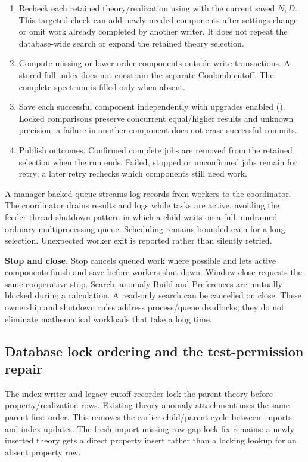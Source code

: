\begin{enumerate}
\item Recheck each retained theory/realization using
 with the current saved $N,D$.
This targeted check can add newly needed components after settings change
or omit work already completed by another writer. It does not repeat the
database-wide search or expand the retained theory selection.
\item Compute missing or lower-order components outside write transactions.
A stored full index does not constrain the separate Coulomb cutoff.
The complete spectrum is filled only when absent.
\item Save each successful component independently with upgrades enabled
(). Locked comparisons preserve concurrent
equal/higher results and unknown precision; a failure in another component
does not erase successful commits.
\item Publish outcomes. Confirmed complete jobs are removed from the retained
selection when the run ends. Failed, stopped or unconfirmed jobs remain for
retry; a later retry rechecks which components still need work.
\end{enumerate}

A manager-backed queue streams log records from workers to the coordinator.
The coordinator drains results and logs while tasks are active, avoiding the
feeder-thread shutdown pattern in which a child waits on a full, undrained
ordinary multiprocessing queue. Scheduling remains bounded even for a long
selection. Unexpected worker exit is reported rather than silently retried.

\textbf{Stop and close.} Stop cancels queued work where possible and lets
active components finish and save before workers shut down. Window close
requests the same cooperative stop. Search, anomaly Build and Preferences
are mutually blocked during a calculation. A read-only search can be cancelled
on close. These ownership and shutdown rules address process/queue deadlocks;
they do not eliminate mathematical workloads that take a long time.

\clearpage
\subsection{Database lock ordering and the test-permission repair}
The index writer and legacy-cutoff recorder lock the parent theory before
property/realization rows. Existing-theory anomaly attachment uses the same
parent-first order. This removes the earlier child/parent cycle between
imports and index updates. The fresh-import missing-row gap-lock fix remains:
a newly inserted theory gets a direct property insert rather than a locking
lookup for an absent property row.

